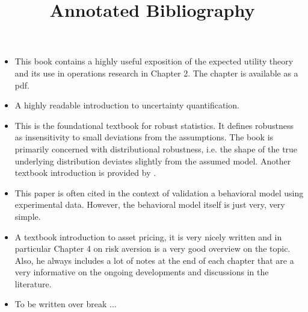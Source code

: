 

\title{Annotated Bibliography}
\author{}
\date{}



\maketitle
\begin{itemize}
\item {}

This book contains a highly useful exposition of the expected utility theory and its use in operations research in Chapter 2. The chapter is available as a pdf.

\item {}

A highly readable introduction to uncertainty quantification.

\item {}

This is the foundational textbook for robust statistics. It defines robustness as insensitivity to small deviations from the assumptions. The book is primarily concerned with distributional robustness, i.e. the shape of the true underlying distribution deviates slightly from the assumed model. Another textbook introduction is provided by \citet{Maronna.2006}.

\item {}

This paper is often cited in the context of validation a behavioral model using experimental data. However, the behavioral model itself is just very, very simple.

\item {}

A textbook introduction to asset pricing, it is very nicely written and in particular Chapter 4 on risk aversion is a very good overview on the topic. Also,  he always includes a lot of notes at the end of each chapter that are a very informative on the ongoing developments and discussions in the literature.

\item {}

To be written over break ...

\end{itemize}






